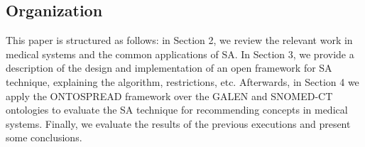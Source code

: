 \subsection{Organization}
This paper is structured as follows: in Section 2, we review the relevant
work in medical systems and the common applications of SA. In Section 3, we provide a description of the design and implementation
of an open framework for SA technique, explaining the algorithm, restrictions, etc. Afterwards, in Section 4 
we apply the ONTOSPREAD framework over the GALEN and SNOMED-CT ontologies to evaluate the SA
technique for recommending concepts in medical systems. Finally, we
evaluate the results of the previous executions and present some conclusions.
